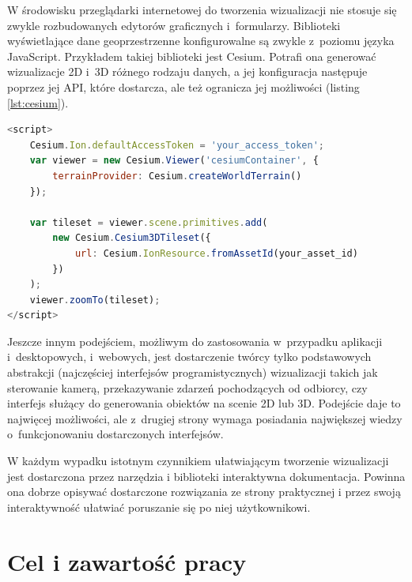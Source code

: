 W środowisku przeglądarki internetowej do tworzenia wizualizacji nie stosuje się zwykle rozbudowanych edytorów graficznych i~formularzy. Biblioteki wyświetlające dane geoprzestrzenne konfigurowalne są zwykle z~poziomu języka JavaScript. Przykładem takiej biblioteki jest Cesium\cite{CesiumJS}. Potrafi ona generować wizualizacje 2D i~3D różnego rodzaju danych, a jej konfiguracja następuje poprzez jej API, które dostarcza, ale też ogranicza jej możliwości (listing \ref{lst:cesium}).

\begin{lstlisting}[label={lst:cesium}, language=javascript, caption={Konfiguracja podstawowej wizualizacji w~bibliotece Cesium. Żródło: \url{https://cesium.com/docs/tutorials/getting-started/}}]
<script>
    Cesium.Ion.defaultAccessToken = 'your_access_token';
    var viewer = new Cesium.Viewer('cesiumContainer', {
        terrainProvider: Cesium.createWorldTerrain()
    });

    var tileset = viewer.scene.primitives.add(
        new Cesium.Cesium3DTileset({
            url: Cesium.IonResource.fromAssetId(your_asset_id)
        })
    );
    viewer.zoomTo(tileset);
</script>
\end{lstlisting}

Jeszcze innym podejściem, możliwym do zastosowania w~przypadku aplikacji i~desktopowych, i~webowych, jest dostarczenie twórcy tylko podstawowych abstrakcji (najczęściej interfejsów programistycznych) wizualizacji takich jak sterowanie kamerą, przekazywanie zdarzeń pochodzących od odbiorcy, czy interfejs służący do generowania obiektów na scenie 2D lub 3D. Podejście daje to najwięcej możliwości, ale z~drugiej strony wymaga posiadania największej wiedzy o~funkcjonowaniu dostarczonych interfejsów.

W każdym wypadku istotnym czynnikiem ułatwiającym tworzenie wizualizacji jest dostarczona przez narzędzia i biblioteki interaktywna dokumentacja. Powinna ona dobrze opisywać dostarczone rozwiązania ze strony praktycznej i przez swoją interaktywność ułatwiać poruszanie się po niej użytkownikowi. 

\section{Cel i zawartość pracy}